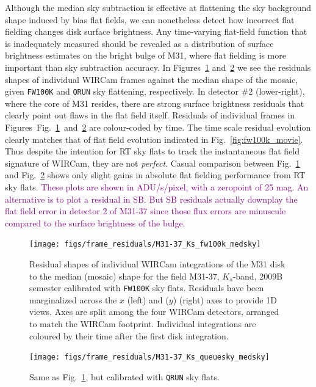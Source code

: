 \documentclass[iop]{emulateapj}
\newcommand{\comment}[1]{\textcolor{purple}{#1}} %
\newcommand{\Fig}[1]{Fig.~\ref{fig:#1}}  %
\begin{document}
Although the median sky subtraction is effective at flattening the sky background shape induced by bias flat fields, we can nonetheless detect how incorrect flat fielding changes disk surface brightness.
Any time-varying flat-field function that is inadequately measured should be revealed as a distribution of surface brightness estimates on the bright bulge of M31, where flat fielding is more important than sky subtraction accuracy.
In Figures~\ref{fig:frame_residuals_M31-37_Ks_fw100k_medsky} and~\ref{fig:frame_residuals_M31-37_Ks_QRUN} we see the residuals shapes of individual WIRCam frames against the median shape of the mosaic, given \texttt{FW100K} and \texttt{QRUN} sky flattening, respectively.
In detector \#2 (lower-right), where the core of M31 resides, there are strong surface brightness residuals that clearly point out flaws in the flat field itself.
Residuals of individual frames in Figures~\Fig{frame_residuals_M31-37_Ks_fw100k_medsky}~and~\ref{fig:frame_residuals_M31-37_Ks_QRUN} are colour-coded by time.
The time scale residual evolution clearly matches that of flat field evolution indicated in \Fig{fw100k_movie}.
Thus despite the intention for RT sky flats to track the instantaneous flat field signature of WIRCam, they are not \emph{perfect}.
Casual comparison between \Fig{frame_residuals_M31-37_Ks_fw100k_medsky} and \Fig{frame_residuals_M31-37_Ks_QRUN} shows only slight gains in absolute flat fielding performance from RT sky flats.
\comment{These plots are shown in ADU/s/pixel, with a zeropoint of 25 mag. An alternative is to plot a residual in SB. But SB residuals actually downplay the flat field error in detector 2 of M31-37 since those flux errors are minuscule compared to the surface brightness of the bulge.}

\begin{figure}[p]
\centering
\texttt{[image: figs/frame\_residuals/M31-37\_Ks\_fw100k\_medsky]}
\caption{Residual shapes of individual WIRCam integrations of the M31 disk to the median (mosaic) shape for the field M31-37, $K_s$-band, 2009B semester calibrated with \texttt{FW100K} sky flats.
Residuals have been marginalized across the $x$ (left) and ($y$) (right) axes to provide 1D views.
Axes are split among the four WIRCam detectors, arranged to match the WIRCam footprint.
Individual integrations are coloured by their time after the first disk integration.}
\label{fig:frame_residuals_M31-37_Ks_fw100k_medsky}
\end{figure}

\begin{figure}[p]
\centering
\texttt{[image: figs/frame\_residuals/M31-37\_Ks\_queuesky\_medsky]}
\caption{Same as \Fig{frame_residuals_M31-37_Ks_fw100k_medsky}, but calibrated with \texttt{QRUN} sky flats.}
\label{fig:frame_residuals_M31-37_Ks_QRUN}
\end{figure}
\end{document}
